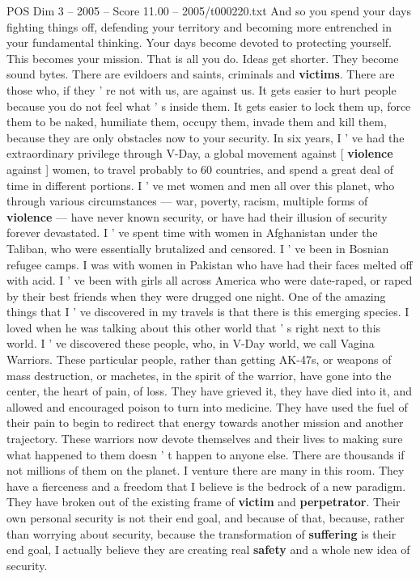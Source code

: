 \begin{textsample}{POS Dim 3 – 2005 – Score 11.00 – 2005/t000220.txt}
And so you spend your days fighting things off, defending your territory and becoming more entrenched in your fundamental thinking.
Your days become devoted to protecting yourself.
This becomes your mission.
That is all you do.
Ideas get shorter.
They become sound bytes.
There are evildoers and saints, criminals and \textbf{victims}.
There are those who, if they ' re not with us, are against us.
It gets easier to hurt people because you do not feel what ' s inside them.
It gets easier to lock them up, force them to be naked, humiliate them, occupy them, invade them and kill them, because they are only obstacles now to your security.
In six years, I ' ve had the extraordinary privilege through V-Day, a global movement against [ \textbf{violence} against ] women, to travel probably to 60 countries, and spend a great deal of time in different portions.
I ' ve met women and men all over this planet, who through various circumstances — war, poverty, racism, multiple forms of \textbf{violence} — have never known security, or have had their illusion of security forever devastated.
I ' ve spent time with women in Afghanistan under the Taliban, who were essentially brutalized and censored.
I ' ve been in Bosnian refugee camps.
I was with women in Pakistan who have had their faces melted off with acid.
I ' ve been with girls all across America who were date-raped, or raped by their best friends when they were drugged one night.
One of the amazing things that I ' ve discovered in my travels is that there is this emerging species.
I loved when he was talking about this other world that ' s right next to this world.
I ' ve discovered these people, who, in V-Day world, we call Vagina Warriors.
These particular people, rather than getting AK-47s, or weapons of mass destruction, or machetes, in the spirit of the warrior, have gone into the center, the heart of pain, of loss.
They have grieved it, they have died into it, and allowed and encouraged poison to turn into medicine.
They have used the fuel of their pain to begin to redirect that energy towards another mission and another trajectory.
These warriors now devote themselves and their lives to making sure what happened to them doesn ' t happen to anyone else.
There are thousands if not millions of them on the planet.
I venture there are many in this room.
They have a fierceness and a freedom that I believe is the bedrock of a new paradigm.
They have broken out of the existing frame of \textbf{victim} and \textbf{perpetrator}.
Their own personal security is not their end goal, and because of that, because, rather than worrying about security, because the transformation of \textbf{suffering} is their end goal, I actually believe they are creating real \textbf{safety} and a whole new idea of security.

\end{textsample}

